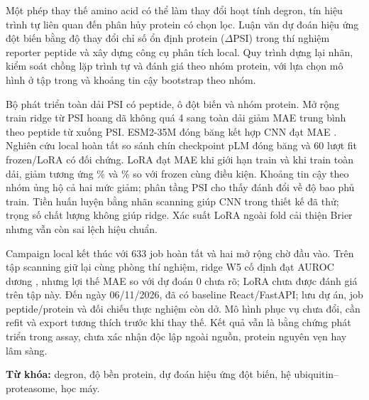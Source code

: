 \begin{otherlanguage}{vietnamese}
Một phép thay thế amino acid có thể làm thay đổi hoạt tính degron, tín hiệu trình tự liên quan đến
phân hủy protein có chọn lọc. Luận văn dự đoán hiệu ứng đột biến bằng độ thay đổi chỉ số ổn định
protein ($\Delta$PSI) trong thí nghiệm reporter peptide và xây dựng công cụ phân tích local.
Quy trình dựng lại nhãn, kiểm soát chồng lặp trình tự và đánh giá theo nhóm protein, với lựa chọn
mô hình ở tập trong và khoảng tin cậy bootstrap theo nhóm.

Bộ phát triển toàn dải PSI có \nVthreeNPeptides{} peptide, \nVthreeNCells{} ô đột biến và
\nVthreeNGroups{} nhóm protein. Mở rộng train ridge từ PSI hoang dã không quá 4 sang toàn dải
giảm MAE trung bình theo peptide từ \nVthreeRidgeB{} xuống \nVthreeRidgeD{} PSI.
ESM2-35M đóng băng kết hợp CNN đạt MAE \nVthreeCnnD{}. Nghiên cứu local hoàn tất so sánh
chín checkpoint pLM đóng băng và 60 lượt fit frozen/LoRA có đối chứng. LoRA đạt MAE
\nCampaignLoraB{} khi giới hạn train và \nCampaignLoraD{} khi train toàn dải, giảm tương ứng
\nCampaignGainB\% và \nCampaignGainD\% so với frozen cùng điều kiện. Khoảng tin cậy theo nhóm
ủng hộ cả hai mức giảm; phân tầng PSI cho thấy đánh đổi về độ bao phủ train. Tiền huấn luyện bằng
nhãn scanning giúp CNN trong thiết kế đã thử; trọng số chất lượng không giúp ridge. Xác suất LoRA
ngoài fold cải thiện Brier nhưng vẫn còn sai lệch hiệu chuẩn.

Campaign local kết thúc với 633 job hoàn tất và hai mở rộng chờ đầu vào. Trên tập scanning giữ
lại cùng phòng thí nghiệm, ridge W5 cố định đạt AUROC dương \nCampaignTAuc{}, nhưng lợi thế
MAE so với dự đoán 0 chưa rõ; LoRA chưa được đánh giá trên tập này. Đến ngày 06/11/2026,
đã có baseline React/FastAPI; lưu dự án, job peptide/protein và đối chiếu thực nghiệm còn dở.
Mô hình phục vụ chưa đổi, cần refit và export tương thích trước khi thay thế. Kết quả vẫn là bằng
chứng phát triển trong assay, chưa xác nhận độc lập ngoài nguồn, protein nguyên vẹn hay lâm sàng.

\par\vspace{6bp}\noindent\textbf{Từ khóa:} degron, độ bền protein, dự đoán hiệu ứng đột biến, hệ ubiquitin--proteasome, học máy.
\end{otherlanguage}
